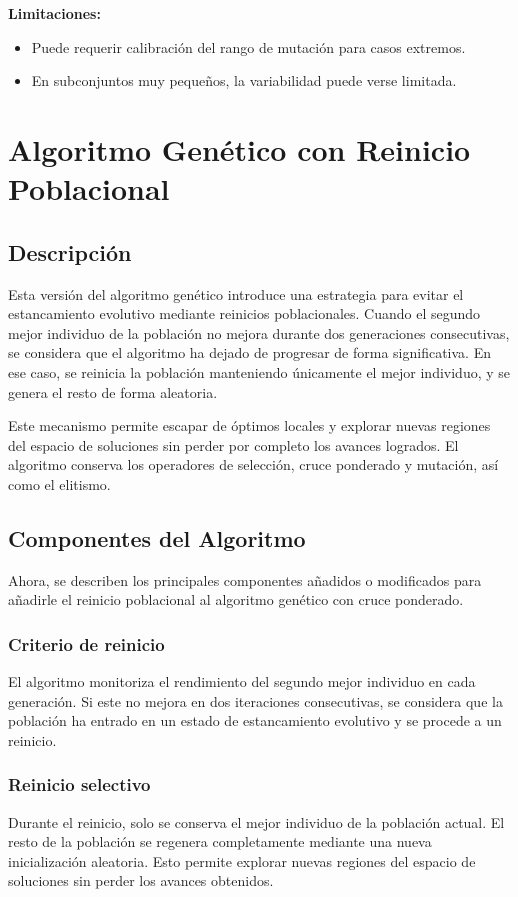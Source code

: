 \textbf{Limitaciones:}
\begin{itemize}
      \item Puede requerir calibración del rango de mutación para casos extremos.
      \item En subconjuntos muy pequeños, la variabilidad puede verse limitada.
\end{itemize}


\section{Algoritmo Genético con Reinicio Poblacional}\label{sec:genetico-v3}
\subsection{Descripción}\label{subsec:descripcion-genetico-v3}
Esta versión del algoritmo genético introduce una estrategia para evitar el estancamiento evolutivo mediante reinicios poblacionales.
Cuando el segundo mejor individuo de la población no mejora durante dos generaciones consecutivas, se considera que el algoritmo ha dejado de progresar de forma significativa.
En ese caso, se reinicia la población manteniendo únicamente el mejor individuo, y se genera el resto de forma aleatoria.


Este mecanismo permite escapar de óptimos locales y explorar nuevas regiones del espacio de soluciones sin perder por completo los avances logrados.
El algoritmo conserva los operadores de selección, cruce ponderado y mutación, así como el elitismo.


\subsection{Componentes del Algoritmo}\label{subsec:componentes-genetico-v3}
Ahora, se describen los principales componentes añadidos o modificados para añadirle el reinicio poblacional al algoritmo genético con cruce ponderado.

\subsubsection{Criterio de reinicio}
El algoritmo monitoriza el rendimiento del segundo mejor individuo en cada generación.
Si este no mejora en dos iteraciones consecutivas, se considera que la población ha entrado en un estado de estancamiento evolutivo y se procede a un reinicio.

\subsubsection{Reinicio selectivo}
Durante el reinicio, solo se conserva el mejor individuo de la población actual.
El resto de la población se regenera completamente mediante una nueva inicialización aleatoria.
Esto permite explorar nuevas regiones del espacio de soluciones sin perder los avances obtenidos.

